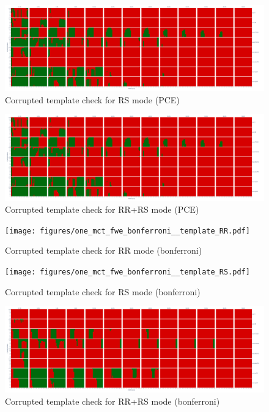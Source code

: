 \documentclass{article}
\begin{document}
\begin{figure}
    \centering
    \includegraphics[width=\linewidth]{figures/one_pce_template_RR.pdf}
    \caption{Corrupted template check for RS mode (PCE)}
\end{figure}

\begin{figure}
    \centering
    \includegraphics[width=\linewidth]{figures/one_pce_template_RR.pdf}
    \caption{Corrupted template check for RR+RS mode (PCE)}
\end{figure}

\begin{figure}
    \centering
    \texttt{[image: figures/one\_mct\_fwe\_bonferroni\_\_template\_RR.pdf]}
    \caption{Corrupted template check for RR mode (bonferroni)}
\end{figure}

\begin{figure}
    \centering
    \texttt{[image: figures/one\_mct\_fwe\_bonferroni\_\_template\_RS.pdf]}
    \caption{Corrupted template check for RS mode (bonferroni)}
\end{figure}

\begin{figure}
    \centering
    \includegraphics[width=\linewidth]{figures/one_mct_fwe_bonferroni__template_RR+RS.pdf}
    \caption{Corrupted template check for RR+RS mode (bonferroni)}
\end{figure}
\end{document}
